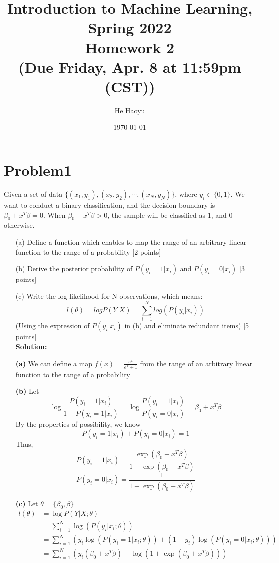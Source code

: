 \documentclass[10pt]{article}
\author{He Haoyu}
\begin{document}
\date{\today}
\title{Introduction to Machine Learning, Spring 2022 \\
Homework 2\\
\small (Due Friday, Apr. 8 at 11:59pm (CST))}
\maketitle


\section{Problem1}
Given a set of data $\{(x_1, y_1), (x_2, y_2), \cdots, (x_N, y_N)\}$, where $y_i \in \{0, 1\}$. We want to conduct a binary classification, and the decision boundary is $\beta_0 + x^T\beta = 0$. When $\beta_0 + x^T\beta > 0$, the sample will be classified as 1, and 0 otherwise. 

\begin{enumerate}

\item[(a)]
Define a function which enables to map the range of an arbitrary linear function to the range of a probability {\color{red} [2 points]}\\

\item[(b)]
Derive the posterior probability of $P(y_i=1 | x_i)$ and $P(y_i=0 | x_i)$ {\color{red} [3 points]}\\

\item[(c)]
Write the log-likelihood for N observations, which means:
$$l(\theta) = logP(Y|X) = \sum_{i=1}^Nlog(P(y_i|x_i))$$
(Using the expression of $P(y_i|x_i)$ in (b) and eliminate redundant items) {\color{red} [5 points]}\\
\textbf{Solution:}

  \item[\textbf{(a)}]
      We can define  a map $f(x)=\frac{e^x}{e^x+1}$ from the range of an arbitrary linear function to the range of a probability
	\item[\textbf{(b)}] 
      Let $$\log \frac{P(y_i=1|x_i)}{1 - P(y_i=1|x_i)} = \log \frac{P(y_i=1|x_i)}{P(y_i=0|x_i)} =\beta_0 +x^T \beta$$
      By the properties of possibility, we know $$P(y_i=1|x_i)+P(y_i=0|x_i) = 1$$
      Thus,$$P(y_i=1|x_i) = \frac{\exp (\beta_0+x^T\beta)}{1+\exp (\beta_0+x^T\beta)}$$
      $$P(y_i=0|x_i) = \frac{1}{1+\exp (\beta_0+x^T\beta)}$$
	\item[\textbf{(c)}] 
      Let $\theta  = \{\beta_0,\beta\}$
      $$
      \begin{aligned}
          l(\theta) &= \log P(Y|X;\theta)
          \\&= \sum_{i=1}^N\log (P(y_i|x_i;\theta))
          \\&=\sum_{i=1}^N(y_i\log (P(y_i=1|x_i;\theta))+ (1-y_i)\log (P(y_i=0|x_i;\theta)))
          \\&=\sum_{i=1}^N(y_i(\beta_0+x^T\beta) -\log (1+\exp (\beta_0+x^T\beta)))
      \end{aligned}
      $$
\end{enumerate}
\newpage
\end{document}
